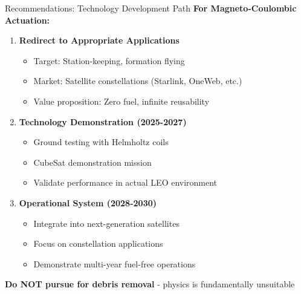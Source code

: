 \documentclass[aspectratio=169]{beamer}
\begin{document}
\begin{frame}{Recommendations: Technology Development Path}
\textbf{For Magneto-Coulombic Actuation:}

\vspace{0.5em}
\begin{enumerate}
    \item \textbf{Redirect to Appropriate Applications}
    \begin{itemize}
        \item Target: Station-keeping, formation flying
        \item Market: Satellite constellations (Starlink, OneWeb, etc.)
        \item Value proposition: Zero fuel, infinite reusability
    \end{itemize}

    \item \textbf{Technology Demonstration (2025-2027)}
    \begin{itemize}
        \item Ground testing with Helmholtz coils
        \item CubeSat demonstration mission
        \item Validate performance in actual LEO environment
    \end{itemize}

    \item \textbf{Operational System (2028-2030)}
    \begin{itemize}
        \item Integrate into next-generation satellites
        \item Focus on constellation applications
        \item Demonstrate multi-year fuel-free operations
    \end{itemize}
\end{enumerate}

\vspace{0.5em}
\textbf{Do NOT pursue for debris removal} - physics is fundamentally unsuitable
\end{frame}
\end{document}
